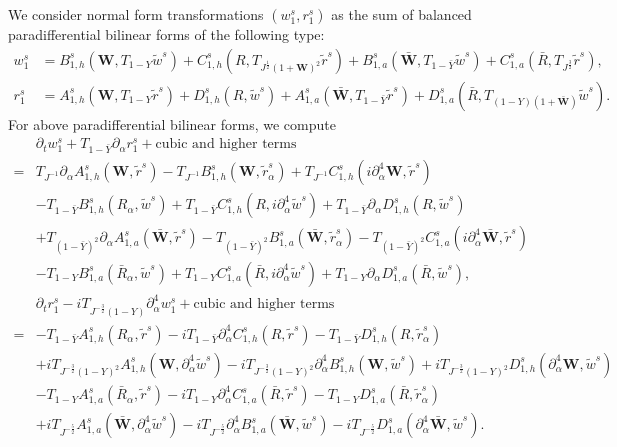 \documentclass[10pt]{amsart}
\theoremstyle{remark}
\theoremstyle{definition}
\numberwithin{equation}{section}
\newcommand{\p}{\partial}
\newcommand{\al}{\alpha}
\newcommand{\f}{\frac}
\newcommand{\bw}{\mathbf{W}}
\begin{document}
We consider normal form transformations $(w^s_1, r^s_1)$ as the sum of balanced paradifferential bilinear forms of the following type:
\begin{equation*} 
\begin{aligned}
w^s_1 &=B^s_{1,h}\left(\bw , T_{1-Y}\tilde{w}^s\right) + C^s_{1,h}\left(R , T_{J^{\frac{1}{2}}(1+\bw)^2}\tilde{r}^s\right)+ B^s_{1,a}\left(\bar{\bw}, T_{1-\bar{Y}}\tilde{w}^s\right) + C^s_{1,a}\left(\bar{R} , T_{J^{\frac{3}{2}}}\tilde{r}^s\right),\\
r^s_1 &=  A^s_{1,h} \left( \bw, T_{1-Y}\tilde{r}^s\right) + D^s_{1,h}\left(R, \tilde{w}^s\right)+A^s_{1,a} \left(\bar{\bw}, T_{1-\bar{Y}}\tilde{r}^s\right) + D^s_{1,a}\left( \bar{R}, T_{(1-Y)(1+\bar{\bw})}\tilde{w}^s\right).
\end{aligned}
\end{equation*}
For above paradifferential bilinear forms, we compute 
\begin{align*}
&\partial_t w^s_1+T_{1-\bar{Y}} \partial_\alpha r^s_1 + \text{cubic and higher terms} \\
=& T_{J^{-1}}\partial_\alpha A^s_{1,h}(\bw, \tilde{r}^s) -T_{J^{-1}}B^s_{1,h}(\bw, \tilde{r}^s_{\al}) +  T_{J^{-1}}C^s_{1,h}(i\p^4_{\al}\bw, \tilde{r}^s) \\
&-T_{1-\bar{Y}}B^s_{1,h}( R_\alpha, \tilde{w}^s)+T_{1-\bar{Y}}C^s_{1,h}(R,i\p_\al^4 \tilde{w}^s) + T_{1-\bar{Y}}\partial_\alpha D^s_{1,h}(R, \tilde{w}^s)\\
&+T_{(1-\bar{Y})^2}\p_{\al}A^s_{1,a}(\bar{\bw}, \tilde{r}^s)-T_{(1-\bar{Y})^2}B^s_{1,a}(\bar{\bw}, \tilde{r}^s_{\al})-T_{(1-\bar{Y})^2}C^s_{1,a}(i\p^4_{\al}\bar{\bw}, \tilde{r}^s)\\
 &-T_{1-Y}B^s_{1,a}(\bar{R}_\alpha, \tilde{w}^s)+T_{1-Y}C^s_{1,a}(\bar{R},i\p_\al^4 \tilde{w}^s) + T_{1-Y}\partial_\alpha D^s_{1,a}(\bar{R}, \tilde{w}^s),\\
&\partial_t r^s_1  -iT_{J^{-\frac{3}{2}}(1-Y)}\p_\al^4 w^s_1+ \text{cubic and higher  terms} \\
=& -T_{1-\bar{Y}}A^s_{1,h}( R_\alpha, \tilde{r}^s) - iT_{1-\bar{Y}}\partial_\alpha^4 C^s_{1,h}(R, \tilde{r}^s) - T_{1-\bar{Y}}D^s_{1,h}(R, \tilde{r}^s_\alpha)\\
&+ iT_{J^{-\frac{3}{2}}(1-Y)^2}A^s_{1,h}(\bw,\p_\al^4 \tilde{w}^s) -iT_{J^{-\frac{3}{2}}(1-Y)^2}\partial_\alpha^4 B^s_{1,h}(\bw, \tilde{w}^s) +iT_{J^{-\frac{3}{2}}(1-Y)^2}D^s_{1,h}(\p_\al^4\bw, \tilde{w}^s)\\
 &-T_{1-Y}A^s_{1,a}(\bar{R}_\alpha, \tilde{r}^s) - iT_{1-Y}\partial_\alpha^4 C^s_{1,a}( \bar{R}, \tilde{r}^s) - T_{1-Y}D^s_{1,a}(\bar{R}, \tilde{r}^s_\alpha)\\
&+ iT_{J^{-\f52}}A^s_{1,a}(\bar{\bw},\p_\al^4 \tilde{w}^s) -iT_{J^{-\f52}}\partial_\alpha^4 B^s_{1,a}(\bar{\bw}, \tilde{w}^s) -iT_{J^{-\f52}}D^s_{1,a}(\p_\al^4\bar{\bw}, \tilde{w}^s).
\end{align*}
\end{document}
